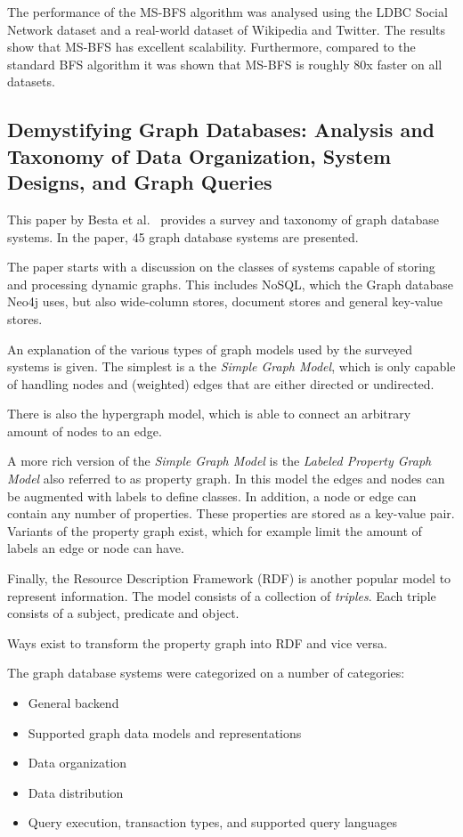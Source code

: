 The performance of the MS-BFS algorithm was analysed using the LDBC Social Network dataset and a real-world dataset of Wikipedia and Twitter. The results show that MS-BFS has excellent scalability. Furthermore, compared to the standard BFS algorithm it was shown that MS-BFS is roughly 80x faster on all datasets. 


\subsection{Demystifying Graph Databases: Analysis and Taxonomy of Data Organization, System Designs, and Graph Queries}

This paper by Besta et al.~\cite{DBLP:journals/corr/abs-1910-09017} provides a survey and taxonomy of graph database systems. In the paper, 45 graph database systems are presented. 

The paper starts with a discussion on the classes of systems capable of storing and processing dynamic graphs. This includes NoSQL, which the Graph database Neo4j uses, but also wide-column stores, document stores and general key-value stores. 

An explanation of the various types of graph models used by the surveyed systems is given. The simplest is a the \textit{Simple Graph Model}, which is only capable of handling nodes and (weighted) edges that are either directed or undirected. 

There is also the hypergraph model, which is able to connect an arbitrary amount of nodes to an edge. 

A more rich version of the \textit{Simple Graph Model} is the \textit{Labeled Property Graph Model} also referred to as property graph. In this model the edges and nodes can be augmented with labels to define classes. In addition, a node or edge can contain any number of properties. These properties are stored as a key-value pair. Variants of the property graph exist, which for example limit the amount of labels an edge or node can have.

Finally, the Resource Description Framework (RDF) is another popular model to represent information. The model consists of a collection of \textit{triples}. Each triple consists of a subject, predicate and object. 

Ways exist to transform the property graph into RDF and vice versa. 


The graph database systems were categorized on a number of categories: 
\begin{itemize}
    \item General backend
    \item Supported graph data models and representations
    \item Data organization
    \item Data distribution
    \item Query execution, transaction types, and supported query languages
\end{itemize}

